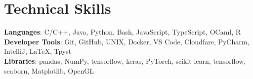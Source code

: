\documentclass[letterpaper,11pt]{article}
\begin{document}
\section{Technical Skills}
 \begin{itemize}[leftmargin=0.15in, label={}]
    \small{\item{
     \textbf{Languages}{: C/C++, Java, Python, Bash, JavaScript, TypeScript, OCaml, R} \\
     \textbf{Developer Tools}{: Git, GitHub, UNIX, Docker, VS Code, Cloudfare, PyCharm, IntelliJ, LaTeX, Tpyst} \\
     \textbf{Libraries}{: pandas, NumPy, tensorflow, keras, PyTorch, scikit-learn, tensorflow, seaborn, Matplotlib, OpenGL}
    }}
 \end{itemize}

\end{document}
